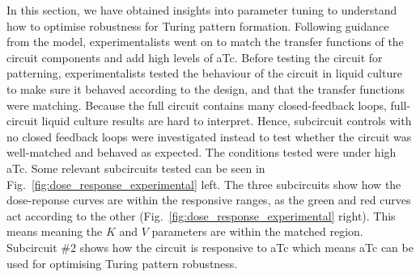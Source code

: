 In this section, we have obtained insights into parameter tuning
to understand how to optimise robustness for Turing pattern formation.
Following guidance from the model,
experimentalists went on to match the transfer functions of the circuit components and add high levels of aTc.
Before testing the circuit for patterning,
experimentalists tested the behaviour of the circuit in liquid culture to make sure it behaved according to the design,
and that the transfer functions were matching.
Because the full circuit contains many closed-feedback loops, full-circuit liquid culture results are hard to interpret.
Hence,
subcircuit controls with no closed feedback loops were investigated
instead to test whether the circuit was well-matched and behaved as expected.
The conditions tested were under high aTc.
Some relevant subcircuits tested can be seen in Fig.~\ref{fig:dose_response_experimental} left.
The three subcircuits show how the dose-reponse curves are within the responsive ranges, as the green and red curves act according to the other (Fig.~\ref{fig:dose_response_experimental} right).
This means meaning the $K$ and $V$ parameters are within the matched region.
Subcircuit \#2 shows how the circuit is responsive to aTc which means aTc can be used for optimising Turing pattern robustness.

